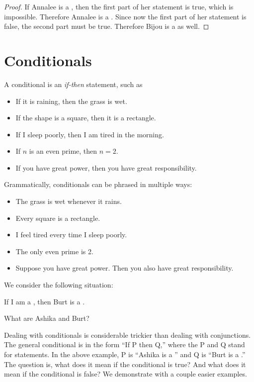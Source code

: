\documentclass{tufte-book}
\begin{document}
\begin{proof}
  If Annalee is a \knave, then the first part of her statement is true, which is impossible. Therefore Annalee is a \knight. Since now the first part of her statement is false, the second part must be true. Therefore Bijou is a \knight as well.
\end{proof}



\section{Conditionals}
\label{sec:conditionals}

A conditional is an \emph{if-then} statement, such as 
\begin{itemize}
    \item If it is raining, then the grass is wet.
    \item If the shape is a square, then it is a rectangle.
    \item If I sleep poorly, then I am tired in the morning.
    \item If $n$ is an even prime, then $n = 2$.
    \item If you have great power, then you have great responsibility.
\end{itemize}
Grammatically, conditionals can be phrased in multiple ways:
\begin{itemize}
    \item The grass is wet whenever it rains.
    \item Every square is a rectangle.
    \item I feel tired every time I sleep poorly.
    \item The only even prime is 2.
    \item Suppose you have great power. Then you also have great responsibility.
\end{itemize}

We consider the following situation:
\begin{example}
  \begin{dialogue}
     If I am a \knight, then Burt is a \knave.
  \end{dialogue}
\end{example}
What are Ashika and Burt?

Dealing with conditionals is considerable trickier than dealing with conjunctions. The general conditional is in the form ``If P then Q,'' where the P and Q stand for statements. In the above example, P is ``Ashika is a \knight'' and Q is ``Burt is a \knave.'' The question is, what does it mean if the conditional is true? And what does it mean if the conditional is false? We demonstrate with a couple easier examples.
\end{document}
